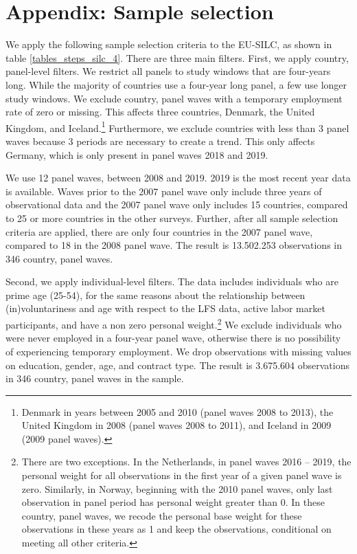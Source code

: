 \section{Appendix: Sample selection}
\label{appendix_sample}

We apply the following sample selection criteria to the EU-SILC, as shown in table \ref{tables_steps_silc_4}.  There are three main filters.  First, we apply country, panel-level filters.  We restrict all panels to study windows that are four-years long.  While the majority of countries use a four-year long panel, a few use longer study windows.  We exclude country, panel waves with a temporary employment rate of zero or missing.  This affects three countries, Denmark, the United Kingdom, and Iceland.\footnote{Denmark in years between 2005 and 2010 (panel waves 2008 to 2013), the United Kingdom in 2008 (panel waves 2008 to 2011), and Iceland in 2009 (2009 panel waves).}  Furthermore, we exclude countries with less than 3 panel waves because 3 periods are necessary to create a trend.  This only affects Germany, which is only present in panel waves 2018 and 2019.

We use 12 panel waves, between 2008 and 2019.  2019 is the most recent year data is available.  Waves prior to the 2007 panel wave only include three years of observational data and the 2007 panel wave only includes 15 countries, compared to 25 or more countries in the other surveys.  Further, after all sample selection criteria are applied, there are only four countries in the 2007 panel wave, compared to 18 in the 2008 panel wave.  The result is 13.502.253 observations in 346 country, panel waves.  

Second, we apply individual-level filters.  The data includes individuals who are prime age (25-54), for the same reasons about the relationship between (in)voluntariness and age with respect to the LFS data, active labor market participants, and have a non zero personal weight.\footnote{There are two exceptions.  In the Netherlands, in panel waves 2016 -- 2019, the personal weight for all observations in the first year of a given panel wave is zero.  Similarly, in Norway, beginning with the 2010 panel waves, only last observation in panel period has personal weight greater than 0.  In these country, panel waves, we recode the personal base weight for these observations in these years as 1 and keep the observations, conditional on meeting all other criteria.}  We exclude individuals who were never employed in a four-year panel wave, otherwise there is no possibility of experiencing temporary employment.  We drop observations with missing values on education, gender, age, and contract type.  The result is 3.675.604 observations in 346 country, panel waves in the sample. 


